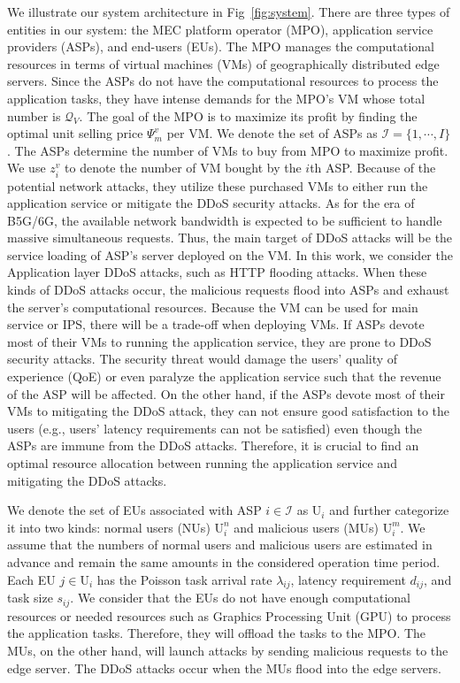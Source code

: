 \documentclass[10pt,journal, compsoc]{IEEEtran}
\begin{document}
We illustrate our system architecture in Fig~\ref{fig:system}. There are three types of entities in our system: the MEC platform operator (MPO), application service providers (ASPs), and end-users (EUs). The MPO manages the computational resources in terms of virtual machines (VMs) of geographically distributed edge servers. Since the ASPs do not have the computational resources to process the application tasks, they have intense demands for the MPO's VM whose total number is $\mathcal{Q}_{V}$. The goal of the MPO is to maximize its profit by finding the optimal unit selling price $\Psi_{m}^v$ per VM. We denote the set of ASPs as $\mathcal{I}=\{1, \cdots, I\}$. The ASPs determine the number of VMs to buy from MPO to maximize profit. We use $z_i^v$ to denote the number of VM bought by the $i$th ASP. Because of the potential network attacks, they utilize these purchased VMs to either run the application service or mitigate the DDoS security attacks. As for the era of B5G/6G, the available network bandwidth is expected to be sufficient to handle massive simultaneous requests. Thus, the main target of DDoS attacks will be the service loading of ASP's server deployed on the VM. In this work, we consider the Application layer DDoS attacks, such as HTTP flooding attacks. When these kinds of DDoS attacks occur, the malicious requests flood into ASPs and exhaust the server's computational resources. Because the VM can be used for main service or IPS, there will be a trade-off when deploying VMs. If ASPs devote most of their VMs to running the application service, they are prone to DDoS security attacks. The security threat would damage the users' quality of experience (QoE) or even paralyze the application service such that the revenue of the ASP will be affected. On the other hand, if the ASPs devote most of their VMs to mitigating the DDoS attack, they can not ensure good satisfaction to the users (e.g., users' latency requirements can not be satisfied) even though the ASPs are immune from the DDoS attacks. Therefore, it is crucial to find an optimal resource allocation between running the application service and mitigating the DDoS attacks.

We denote the set of EUs associated with ASP $i \in \mathcal{I}$ as $\mathrm{U}_i$ and further categorize it into two kinds: normal users (NUs) $\mathrm{U}_i^n$ and malicious users (MUs) $\mathrm{U}_i^m$. We assume that the numbers of normal users and malicious users are estimated in advance and remain the same amounts in the considered operation time period. Each EU $j \in \mathrm{U}_i$ has the Poisson task arrival rate $\lambda_{ij}$, latency requirement $d_{ij}$, and task size $s_{ij}$. We consider that the EUs do not have enough computational resources or needed resources such as Graphics Processing Unit (GPU) to process the application tasks. Therefore, they will offload the tasks to the MPO. The MUs, on the other hand, will launch attacks by sending malicious requests to the edge server. The DDoS attacks occur when the MUs flood into the edge servers. 
\end{document}
